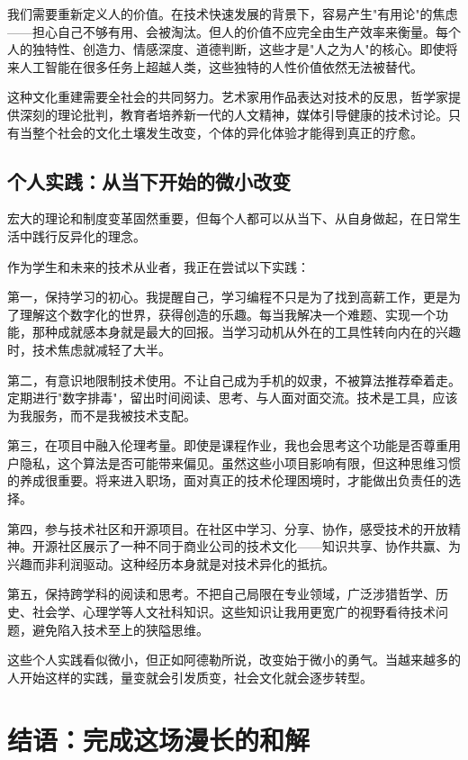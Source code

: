 \documentclass[a4paper,12pt]{ctexart}
\begin{document}
我们需要重新定义人的价值。在技术快速发展的背景下，容易产生"有用论"的焦虑——担心自己不够有用、会被淘汰。但人的价值不应完全由生产效率来衡量。每个人的独特性、创造力、情感深度、道德判断，这些才是"人之为人"的核心。即使将来人工智能在很多任务上超越人类，这些独特的人性价值依然无法被替代。

这种文化重建需要全社会的共同努力。艺术家用作品表达对技术的反思，哲学家提供深刻的理论批判，教育者培养新一代的人文精神，媒体引导健康的技术讨论。只有当整个社会的文化土壤发生改变，个体的异化体验才能得到真正的疗愈。

\subsection{个人实践：从当下开始的微小改变}

宏大的理论和制度变革固然重要，但每个人都可以从当下、从自身做起，在日常生活中践行反异化的理念。

作为学生和未来的技术从业者，我正在尝试以下实践：

第一，保持学习的初心。我提醒自己，学习编程不只是为了找到高薪工作，更是为了理解这个数字化的世界，获得创造的乐趣。每当我解决一个难题、实现一个功能，那种成就感本身就是最大的回报。当学习动机从外在的工具性转向内在的兴趣时，技术焦虑就减轻了大半。

第二，有意识地限制技术使用。不让自己成为手机的奴隶，不被算法推荐牵着走。定期进行"数字排毒"，留出时间阅读、思考、与人面对面交流。技术是工具，应该为我服务，而不是我被技术支配。

第三，在项目中融入伦理考量。即使是课程作业，我也会思考这个功能是否尊重用户隐私，这个算法是否可能带来偏见。虽然这些小项目影响有限，但这种思维习惯的养成很重要。将来进入职场，面对真正的技术伦理困境时，才能做出负责任的选择。

第四，参与技术社区和开源项目。在社区中学习、分享、协作，感受技术的开放精神。开源社区展示了一种不同于商业公司的技术文化——知识共享、协作共赢、为兴趣而非利润驱动。这种经历本身就是对技术异化的抵抗。

第五，保持跨学科的阅读和思考。不把自己局限在专业领域，广泛涉猎哲学、历史、社会学、心理学等人文社科知识。这些知识让我用更宽广的视野看待技术问题，避免陷入技术至上的狭隘思维。

这些个人实践看似微小，但正如阿德勒所说，改变始于微小的勇气。当越来越多的人开始这样的实践，量变就会引发质变，社会文化就会逐步转型。

\section{结语：完成这场漫长的和解}
\end{document}
